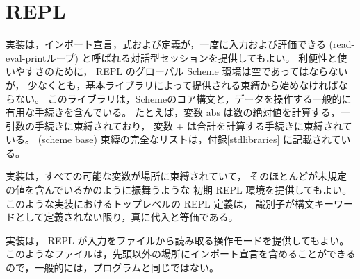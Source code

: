 \section{REPL}

実装は，インポート宣言，式および定義が，一度に入力および評価できる  (read-eval-printループ) と呼ばれる対話型セッションを提供してもよい。
利便性と使いやすさのために， REPL のグローバル Scheme 環境は空であってはならないが，
少なくとも，基本ライブラリによって提供される束縛から始めなければならない。
このライブラリは，Schemeのコア構文と，データを操作する一般的に有用な手続きを含んでいる。
たとえば，変数 {\cf abs} は数の絶対値を計算する，一引数の手続きに束縛されており，
変数 {\cf +} は合計を計算する手続きに束縛されている。
 {\cf(scheme base)} 束縛の完全なリストは，付録\ref{stdlibraries} に記載されている。

実装は，すべての可能な変数が場所に束縛されていて，
そのほとんどが未規定の値を含んでいるかのように振舞うような
初期 REPL 環境を提供してもよい。
このような実装におけるトップレベルの REPL 定義は，
識別子が構文キーワードとして定義されない限り，真に代入と等価である。

実装は， REPL が入力をファイルから読み取る操作モードを提供してもよい。
このようなファイルは，先頭以外の場所にインポート宣言を含めることができるので，一般的には，プログラムと同じではない。

